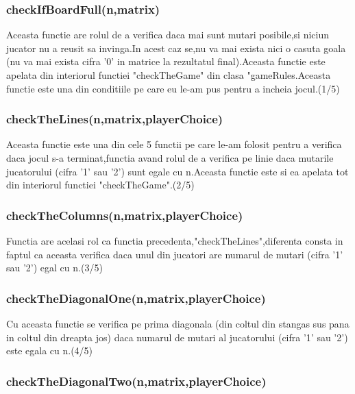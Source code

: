 \documentclass[12]{article}
\begin{document}
\subsubsection{checkIfBoardFull(n,matrix)}
\textcolor{white}{}

Aceasta functie are rolul de a verifica daca  mai sunt mutari posibile,si niciun jucator nu a reusit sa invinga.In acest caz se,nu va mai exista nici o casuta goala (nu va mai exista cifra '0' in matrice la rezultatul final).Aceasta functie este apelata din interiorul functiei "checkTheGame" din clasa "gameRules.Aceasta functie este una din conditiile pe care eu le-am pus pentru a incheia jocul.(1/5)


\subsubsection{checkTheLines(n,matrix,playerChoice)}
\textcolor{white}{}

Aceasta functie este una din cele 5 functii pe care le-am folosit pentru a verifica daca jocul s-a terminat,functia avand rolul de a verifica pe linie daca mutarile jucatorului (cifra '1' sau '2') sunt egale cu n.Aceasta functie este si ea apelata tot din interiorul functiei "checkTheGame".(2/5)

\subsubsection{checkTheColumns(n,matrix,playerChoice)}
\textcolor{white}{}

Functia are acelasi rol ca functia precedenta,"checkTheLines",diferenta consta in faptul ca aceasta verifica daca unul din jucatori are numarul de mutari (cifra '1' sau '2') egal cu n.(3/5)

\subsubsection{checkTheDiagonalOne(n,matrix,playerChoice)}
\textcolor{white}{}

Cu aceasta functie se verifica pe prima diagonala (din coltul din stangas sus pana in coltul din dreapta jos) daca numarul de mutari al jucatorului (cifra '1' sau '2') este egala cu n.(4/5)

\subsubsection{checkTheDiagonalTwo(n,matrix,playerChoice)}
\textcolor{white}{}
\end{document}
